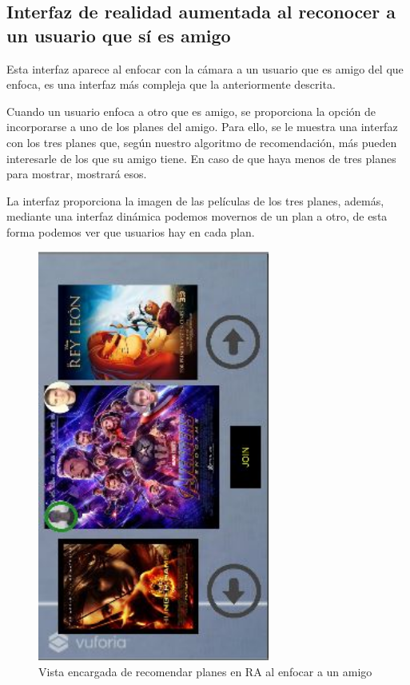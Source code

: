 \subsection{Interfaz de realidad aumentada al reconocer a un usuario que sí es amigo}
\label{makereference3.4.5.2}
\begin{flushleft}
Esta interfaz aparece al enfocar con la cámara a un usuario que es amigo del que enfoca, 
es una interfaz más compleja que la anteriormente descrita.
\end{flushleft}
\begin{flushleft}
Cuando un usuario enfoca a otro que es amigo, se proporciona la opción de incorporarse a uno de los planes del
 amigo. Para ello, se le muestra una interfaz con los tres planes que, según nuestro algoritmo de recomendación,
  más pueden interesarle de los que su amigo tiene. En caso de que haya menos de tres planes para mostrar, mostrará esos.
\end{flushleft}
\begin{flushleft}
La interfaz proporciona la imagen de las películas de los tres planes, además, mediante una interfaz dinámica 
podemos movernos de un plan a otro, de esta forma podemos ver que usuarios hay en cada plan.
\end{flushleft}
\begin{figure}[H]
        \centering
        \includegraphics[width=3in, angle=270]{figures/chapter-2/CapturaRecomendador.JPG}
        \caption{Vista encargada de recomendar planes en RA al enfocar a un amigo}
\end{figure}

